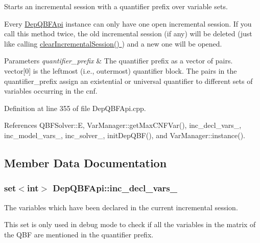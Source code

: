 Starts an incremental session with a quantifier prefix over variable sets. 

Every \hyperlink{classDepQBFApi}{Dep\-Q\-B\-F\-Api} instance can only have one open incremental session. If you call this method twice, the old incremental session (if any) will be deleted (just like calling \hyperlink{classDepQBFApi_a4cacfbb0e933d8a66bd24ce5b71ea623}{clear\-Incremental\-Session() }) and a new one will be opened.


\begin{DoxyParams}{Parameters}
{\em quantifier\-\_\-prefix} & The quantifier prefix as a vector of pairs. vector\mbox{[}0\mbox{]} is the leftmost (i.\-e., outermost) quantifier block. The pairs in the quantifier\-\_\-prefix assign an existential or universal quantifier to different sets of variables occurring in the cnf. \\
\hline
\end{DoxyParams}


Definition at line 355 of file Dep\-Q\-B\-F\-Api.\-cpp.



References Q\-B\-F\-Solver\-::\-E, Var\-Manager\-::get\-Max\-C\-N\-F\-Var(), inc\-\_\-decl\-\_\-vars\-\_\-, inc\-\_\-model\-\_\-vars\-\_\-, inc\-\_\-solver\-\_\-, init\-Dep\-Q\-B\-F(), and Var\-Manager\-::instance().



\subsection{Member Data Documentation}
\hypertarget{classDepQBFApi_a28c913cc99ac6671a2f86dafe1c9f55a}{
\subsubsection[{inc\-\_\-decl\-\_\-vars\-\_\-}]{\setlength{\rightskip}{0pt plus 5cm}set$<$int$>$ Dep\-Q\-B\-F\-Api\-::inc\-\_\-decl\-\_\-vars\-\_\-\hspace{0.3cm}{\ttfamily [protected]}}}\label{classDepQBFApi_a28c913cc99ac6671a2f86dafe1c9f55a}


The variables which have been declared in the current incremental session. 

This set is only used in debug mode to check if all the variables in the matrix of the Q\-B\-F are mentioned in the quantifier prefix. 

